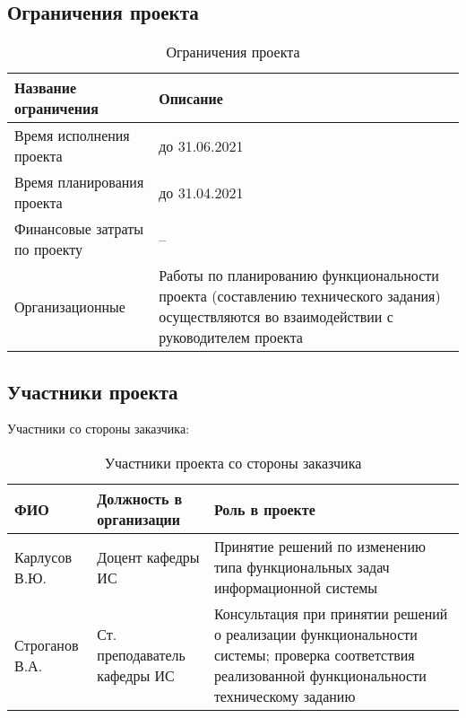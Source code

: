 \documentclass[a4paper,14pt]{extarticle}
\begin{document}
\subsection{Ограничения проекта}
\begin{table}[H]
    \caption{Ограничения проекта}
    \begin{tabular}{ | p{5.425cm} | p{11cm} | }
        \hline
        Название ограничения & Описание \\ \hline
        Время исполнения проекта & до 31.06.2021 \\ \hline
        Время планирования проекта & до 31.04.2021 \\ \hline
        Финансовые затраты по проекту & -- \\ \hline
        Организационные & Работы по планированию функциональности проекта (составлению технического задания) осуществляются во взаимодействии с руководителем проекта \\ \hline
    \end{tabular}
\end{table}

\subsection{Участники проекта}
Участники со стороны заказчика:
\begin{table}[H]
    \caption{Участники проекта со стороны заказчика}
    \begin{tabular}{ | p{4cm} | p{5cm} | p{7cm} | }
        \hline
        ФИО & Должность в организации & Роль в проекте \\ \hline
        Карлусов В.Ю. & Доцент кафедры ИС & Принятие решений по изменению типа функциональных задач информационной системы \\ \hline
        Строганов В.А. & Ст. преподаватель кафедры ИС & Консультация при принятии решений о реализации функциональности системы; проверка соответствия реализованной функциональности техническому заданию \\ \hline
    \end{tabular}
\end{table}
\end{document}
